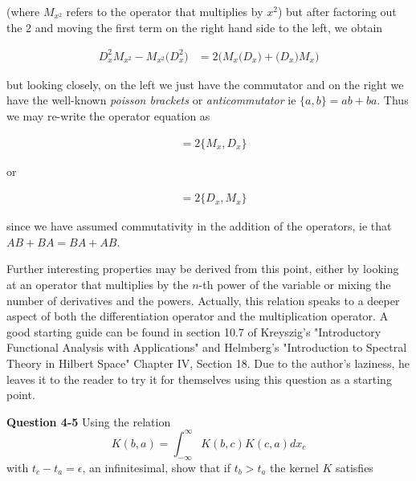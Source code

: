 \documentclass{article}
\begin{document}
(where $M_{x^{2}}$ refers to the operator that multiplies by $x^2$) but after factoring out the 2 and moving the first term on the right hand side to the left, we obtain 

\begin{align*}
         D_{x}^{2} M_{x^{2}} - M_{x^{2}}\big( D_{x}^{2} \big)  &=2\big( M_{x}\big( D_{x} \big) + \big( D_{x} \big)M_{x} \big) 
\end{align*}

but looking closely, on the left we just have the commutator and on the right we have the well-known \textit{poisson brackets} or \textit{anticommutator} ie $\{a,b \} = ab + ba$. Thus we may re-write the operator equation as 

\begin{align*}
         [D_{x}^{2}, M_{x^{2}}] &=2\{M_{x},  D_{x} \}
\end{align*}

or 

\begin{align*}
         [D_{x}^{2}, M_{x^{2}}] &=2\{ D_{x}, M_{x} \}
\end{align*}


since we have assumed commutativity in the addition of the operators, ie that $AB + BA = BA + AB$. 

Further interesting properties may be derived from this point, either by looking at an operator that multiplies by the $n$-th power of the variable or mixing the number of derivatives and the powers. Actually, this relation speaks to a deeper aspect of both the differentiation operator and the multiplication operator. A good starting guide can be found in section 10.7 of Kreyszig's "Introductory Functional Analysis with Applications" and Helmberg's "Introduction to Spectral Theory in Hilbert Space" Chapter IV, Section 18.\citep{kreyszigfunctional} Due to the author's laziness, he leaves it to the reader to try it for themselves using this question as a starting point. 



\textbf{Question 4-5} Using the relation 
\begin{equation*}
    K(b,a) = \int_{-\infty}^{\infty} K(b,c)K(c,a) dx_{c}
\end{equation*}
with $t_{c} - t_{a} = \epsilon$, an infinitesimal, show that if $t_{b} > t_{a} $ the kernel $K$ satisfies
\end{document}
